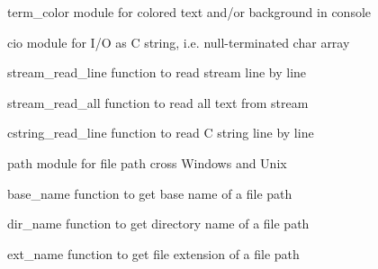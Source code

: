
\begin{DoxyItemize}
\item {\ttfamily term\+\_\+color} module for colored text and/or background in console
\item {\ttfamily cio} module for I/O as C string, i.\+e. null-\/terminated {\ttfamily char} array
\begin{DoxyItemize}
\item {\ttfamily stream\+\_\+read\+\_\+line} function to read stream line by line
\item {\ttfamily stream\+\_\+read\+\_\+all} function to read all text from stream
\item {\ttfamily cstring\+\_\+read\+\_\+line} function to read C string line by line
\end{DoxyItemize}
\item {\ttfamily path} module for file path cross Windows and Unix
\begin{DoxyItemize}
\item {\ttfamily base\+\_\+name} function to get base name of a file path
\item {\ttfamily dir\+\_\+name} function to get directory name of a file path
\item {\ttfamily ext\+\_\+name} function to get file extension of a file path 
\end{DoxyItemize}
\end{DoxyItemize}